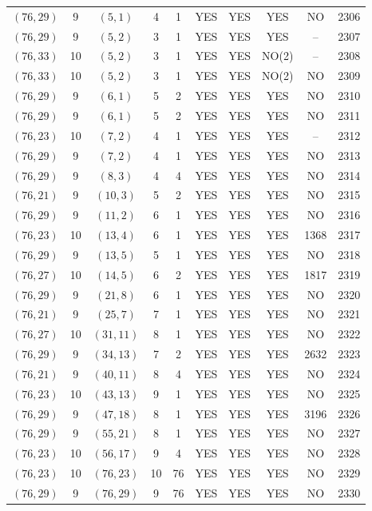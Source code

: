 \begin{longtable}{|c|c|c|c|c|c|c|c|c|c|}
$(76, 29)$ & 9 & $(5, 1)$ & 4 & 1 & YES & YES & YES & NO & 2306\\
$(76, 29)$ & 9 & $(5, 2)$ & 3 & 1 & YES & YES & YES & -- & 2307\\
$(76, 33)$ & 10 & $(5, 2)$ & 3 & 1 & YES & YES & NO(2) & -- & 2308\\
$(76, 33)$ & 10 & $(5, 2)$ & 3 & 1 & YES & YES & NO(2) & NO & 2309\\
$(76, 29)$ & 9 & $(6, 1)$ & 5 & 2 & YES & YES & YES & NO & 2310\\
$(76, 29)$ & 9 & $(6, 1)$ & 5 & 2 & YES & YES & YES & NO & 2311\\
$(76, 23)$ & 10 & $(7, 2)$ & 4 & 1 & YES & YES & YES & -- & 2312\\
$(76, 29)$ & 9 & $(7, 2)$ & 4 & 1 & YES & YES & YES & NO & 2313\\
$(76, 29)$ & 9 & $(8, 3)$ & 4 & 4 & YES & YES & YES & NO & 2314\\
$(76, 21)$ & 9 & $(10, 3)$ & 5 & 2 & YES & YES & YES & NO & 2315\\
$(76, 29)$ & 9 & $(11, 2)$ & 6 & 1 & YES & YES & YES & NO & 2316\\
$(76, 23)$ & 10 & $(13, 4)$ & 6 & 1 & YES & YES & YES & 1368 & 2317\\
$(76, 29)$ & 9 & $(13, 5)$ & 5 & 1 & YES & YES & YES & NO & 2318\\
$(76, 27)$ & 10 & $(14, 5)$ & 6 & 2 & YES & YES & YES & 1817 & 2319\\
$(76, 29)$ & 9 & $(21, 8)$ & 6 & 1 & YES & YES & YES & NO & 2320\\
$(76, 21)$ & 9 & $(25, 7)$ & 7 & 1 & YES & YES & YES & NO & 2321\\
$(76, 27)$ & 10 & $(31, 11)$ & 8 & 1 & YES & YES & YES & NO & 2322\\
$(76, 29)$ & 9 & $(34, 13)$ & 7 & 2 & YES & YES & YES & 2632 & 2323\\
$(76, 21)$ & 9 & $(40, 11)$ & 8 & 4 & YES & YES & YES & NO & 2324\\
$(76, 23)$ & 10 & $(43, 13)$ & 9 & 1 & YES & YES & YES & NO & 2325\\
$(76, 29)$ & 9 & $(47, 18)$ & 8 & 1 & YES & YES & YES & 3196 & 2326\\
$(76, 29)$ & 9 & $(55, 21)$ & 8 & 1 & YES & YES & YES & NO & 2327\\
$(76, 23)$ & 10 & $(56, 17)$ & 9 & 4 & YES & YES & YES & NO & 2328\\
$(76, 23)$ & 10 & $(76, 23)$ & 10 & 76 & YES & YES & YES & NO & 2329\\
$(76, 29)$ & 9 & $(76, 29)$ & 9 & 76 & YES & YES & YES & NO & 2330\\

\end{longtable}
